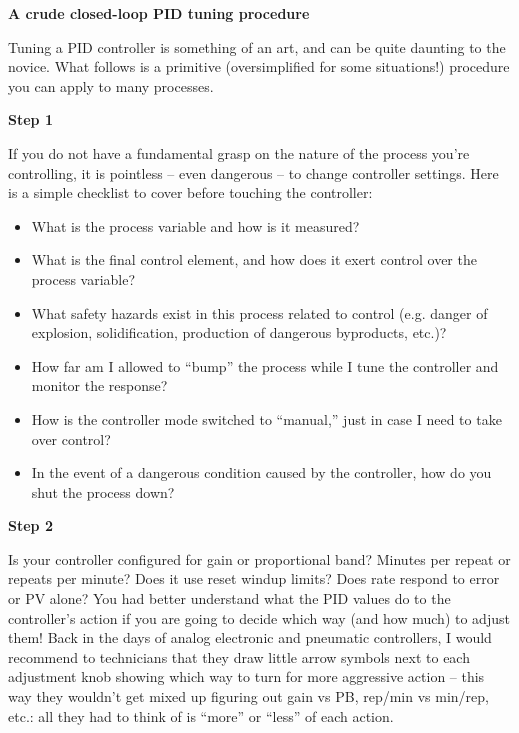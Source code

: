 \documentclass[12pt,a4paper]{article}
\begin{document}
\vfil \eject

\centerline{\bf A crude closed-loop PID tuning procedure}

\vskip 10pt

Tuning a PID controller is something of an art, and can be quite daunting to the novice.  What follows is a primitive (oversimplified for some situations!) procedure you can apply to many processes.

\vskip 10pt

\noindent
{\bf Step 1}

  If you do not have a fundamental grasp on the nature of the process you're controlling, it is pointless -- even dangerous -- to change controller settings.  Here is a simple checklist to cover before touching the controller:

\begin{itemize}
\item{} What is the process variable and how is it measured?
\item{} What is the final control element, and how does it exert control over the process variable?
\item{} What safety hazards exist in this process related to control (e.g. danger of explosion, solidification, production of dangerous byproducts, etc.)?  
\item{} How far am I allowed to ``bump'' the process while I tune the controller and monitor the response?
\item{} How is the controller mode switched to ``manual,'' just in case I need to take over control?
\item{} In the event of a dangerous condition caused by the controller, how do you shut the process down?
\end{itemize}

\vskip 10pt

\noindent
{\bf Step 2}

  Is your controller configured for gain or proportional band?  Minutes per repeat or repeats per minute?  Does it use reset windup limits?  Does rate respond to error or PV alone?  You had better understand what the PID values do to the controller's action if you are going to decide which way (and how much) to adjust them!  Back in the days of analog electronic and pneumatic controllers, I would recommend to technicians that they draw little arrow symbols next to each adjustment knob showing which way to turn for more aggressive action -- this way they wouldn't get mixed up figuring out gain vs PB, rep/min vs min/rep, etc.: all they had to think of is ``more'' or ``less'' of each action.
\end{document}
